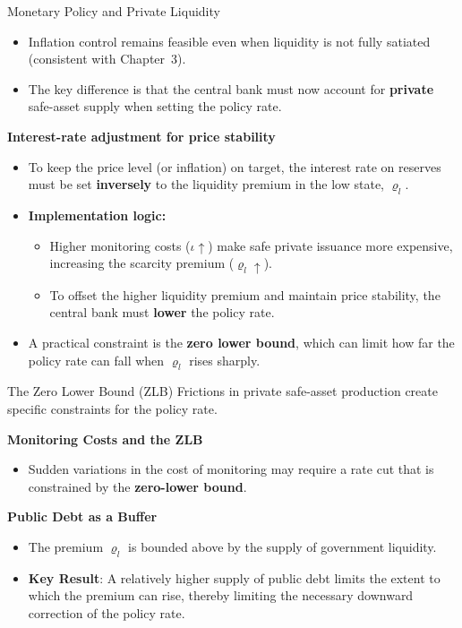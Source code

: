 \documentclass[11pt,aspectratio=169]{beamer}
\begin{document}
\begin{frame}{Monetary Policy and Private Liquidity}
\small

\begin{itemize}
  \item Inflation control remains feasible even when liquidity is not fully satiated (consistent with Chapter~3).
  \item The key difference is that the central bank must now account for \textbf{private} safe-asset supply when setting the policy rate.
\end{itemize}

\vspace{0.3cm}
\textbf{Interest-rate adjustment for price stability}
\begin{itemize}
  \item To keep the price level (or inflation) on target, the interest rate on reserves must be set \textbf{inversely} to the liquidity premium in the low state, $\varrho_l$.
  \item \textbf{Implementation logic:}
  \begin{itemize}
    \item Higher monitoring costs ($\iota\uparrow$) make safe private issuance more expensive, increasing the scarcity premium ($\varrho_l\uparrow$).
    \item To offset the higher liquidity premium and maintain price stability, the central bank must \textbf{lower} the policy rate.
  \end{itemize}
  \item A practical constraint is the \textbf{zero lower bound}, which can limit how far the policy rate can fall when $\varrho_l$ rises sharply.
\end{itemize}

\end{frame}


\begin{frame}{The Zero Lower Bound (ZLB)}
\small
Frictions in private safe-asset production create specific constraints for the policy rate.

\vspace{0.3cm}
\textbf{Monitoring Costs and the ZLB}
\begin{itemize}
    \item Sudden variations in the cost of monitoring may require a rate cut that is constrained by the \textbf{zero-lower bound}.
\end{itemize}

\vspace{0.3cm}
\textbf{Public Debt as a Buffer}
\begin{itemize}
    \item The premium $\varrho_l$ is bounded above by the supply of government liquidity.
    \item \textbf{Key Result}: A relatively higher supply of public debt limits the extent to which the premium can rise, thereby limiting the necessary downward correction of the policy rate. 
\end{itemize}
\end{frame}
\end{document}
